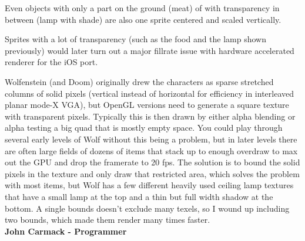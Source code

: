 Even objects with only a part on the ground (meat) of with transparency in between (lamp with shade) are also one sprite centered and scaled vertically.\\



  \begin{minipage}{.5\textwidth} 
   \end{minipage}
  \begin{minipage}{.5\textwidth} 
   \end{minipage}

\par

 Sprites with a lot of transparency (such as the food and the lamp shown previously) would later turn out a major fillrate issue with hardware accelerated renderer for the iOS port.\\
\par
\begin{fancyquotes}
Wolfenstein (and Doom) originally drew the characters as sparse stretched columns of solid pixels (vertical instead of horizontal for efficiency in interleaved planar mode-X VGA), but OpenGL versions need to generate a square texture with transparent pixels.  Typically this is then drawn by either alpha blending or alpha testing a big quad that is mostly empty space.  You could play through several early levels of Wolf without this being a problem, but in later levels there are often large fields of dozens of items that stack up to enough overdraw to max out the GPU and drop the framerate to 20 fps.  The solution is to bound the solid pixels in the texture and only draw that restricted area, which solves the problem with most items, but Wolf has a few different heavily used ceiling lamp textures that have a small lamp at the top and a thin but full width shadow at the bottom.  A single bounds doesn't exclude many texels, so I wound up including two bounds, which made them render many times faster. 
\bigskip \\
\textbf{John Carmack - Programmer}
 \end{fancyquotes}

\par












